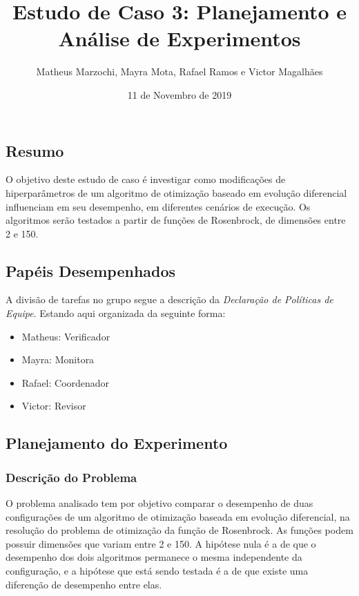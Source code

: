 \documentclass[]{article}
\title{Estudo de Caso 3: Planejamento e Análise de Experimentos}
\author{Matheus Marzochi, Mayra Mota, Rafael Ramos e Victor Magalhães}
\date{11 de Novembro de 2019}
\providecommand{\tightlist}{%
  \setlength{\itemsep}{0pt}\setlength{\parskip}{0pt}}
\begin{document}
\maketitle

\hypertarget{resumo}{%
\subsection{Resumo}\label{resumo}}

O objetivo deste estudo de caso é investigar como modificações de
hiperparâmetros de um algoritmo de otimização baseado em evolução
diferencial influenciam em seu desempenho, em diferentes cenários de
execução. Os algoritmos serão testados a partir de funções de
Rosenbrock, de dimensões entre 2 e 150.

\hypertarget{papeis-desempenhados}{%
\subsection{Papéis Desempenhados}\label{papeis-desempenhados}}

A divisão de tarefas no grupo segue a descrição da \emph{Declaração de
Políticas de Equipe}. Estando aqui organizada da seguinte forma:

\begin{itemize}
\tightlist
\item
  Matheus: Verificador
\item
  Mayra: Monitora
\item
  Rafael: Coordenador
\item
  Victor: Revisor
\end{itemize}

\hypertarget{planejamento-do-experimento}{%
\subsection{Planejamento do
Experimento}\label{planejamento-do-experimento}}

\hypertarget{descricao-do-problema}{%
\subsubsection{Descrição do Problema}\label{descricao-do-problema}}

O problema analisado tem por objetivo comparar o desempenho de duas
configurações de um algoritmo de otimização baseada em evolução
diferencial, na resolução do problema de otimização da função de
Rosenbrock. As funções podem possuir dimensões que variam entre 2 e 150.
A hipótese nula é a de que o desempenho dos dois algoritmos permanece o
mesma independente da configuração, e a hipótese que está sendo testada
é a de que existe uma diferenção de desempenho entre elas.
\end{document}
